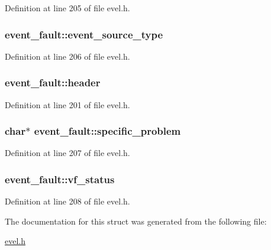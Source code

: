 Definition at line 205 of file evel.\+h.

\hypertarget{structevent__fault_ae724b6a8c8056d11fae378da50063577}{}
\subsubsection[{event\+\_\+source\+\_\+type}]{ event\+\_\+fault\+::event\+\_\+source\+\_\+type}\label{structevent__fault_ae724b6a8c8056d11fae378da50063577}


Definition at line 206 of file evel.\+h.

\hypertarget{structevent__fault_a4d189397d39b197f2c6e2527be76b5f9}{}
\subsubsection[{header}]{ event\+\_\+fault\+::header}\label{structevent__fault_a4d189397d39b197f2c6e2527be76b5f9}


Definition at line 201 of file evel.\+h.

\hypertarget{structevent__fault_ac527105fea5c184089d8b5e7440c5bef}{}
\subsubsection[{specific\+\_\+problem}]{\setlength{\rightskip}{0pt plus 5cm}char$\ast$ event\+\_\+fault\+::specific\+\_\+problem}\label{structevent__fault_ac527105fea5c184089d8b5e7440c5bef}


Definition at line 207 of file evel.\+h.

\hypertarget{structevent__fault_aa82d21b95c0d1ef7ab6740a9b52f722f}{}
\subsubsection[{vf\+\_\+status}]{ event\+\_\+fault\+::vf\+\_\+status}\label{structevent__fault_aa82d21b95c0d1ef7ab6740a9b52f722f}


Definition at line 208 of file evel.\+h.



The documentation for this struct was generated from the following file\+:\begin{DoxyCompactItemize}
\item 
\hyperlink{evel_8h}{evel.\+h}\end{DoxyCompactItemize}
